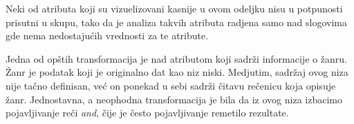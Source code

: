 Neki od atributa koji su vizuelizovani kasnije u ovom odeljku nisu u potpunosti prisutni u skupu, tako da je analiza takvih atributa radjena samo nad slogovima gde nema nedostaju\'c{}ih vrednosti za te atribute.

Jedna od op\v{s}tih transformacija je nad atributom koji sadr\v{z}i informacije o \v{z}anru. \v{Z}anr je podatak koji je originalno dat kao niz niski. Medjutim, sadr\v{z}aj ovog niza nije ta\v{c}no definisan, ve\'c{} on ponekad u sebi sadr\v{z}i \v{c}itavu re\v{c}enicu koja opisuje \v{z}anr. Jednostavna, a neophodna transformacija je bila da iz ovog niza izbacimo pojavljivanje re\v{c}i \emph{and}, \v{c}ije je \v{c}esto pojavljivanje remetilo rezultate.
